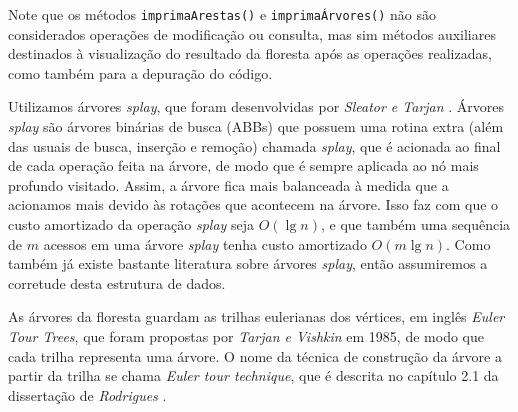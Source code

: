 Note que os métodos \texttt{imprimaArestas()} e \texttt{imprimaÁrvores()} não são considerados operações de modificação ou consulta, mas sim métodos auxiliares destinados à visualização do resultado da floresta após as operações realizadas, como também para a depuração do código.  

Utilizamos árvores \textit{splay}, que foram desenvolvidas por \textit{Sleator e Tarjan} \cite{sleator}. Árvores \textit{splay} são árvores binárias de busca (ABBs) que possuem uma rotina extra (além das usuais de busca, inserção e remoção) chamada \textit{splay}, que é acionada ao final de cada operação feita na árvore, de modo que é sempre aplicada ao nó mais profundo visitado. Assim, a árvore fica mais balanceada à medida que a acionamos mais devido às rotações que acontecem na árvore. Isso faz com que o custo amortizado da operação \textit{splay} seja $O(\lg n)$, e que também uma sequência de $m$ acessos em uma árvore \textit{splay} tenha custo amortizado $O(m \lg n)$.  Como também já existe bastante literatura sobre árvores \textit{splay}, então assumiremos a corretude desta estrutura de dados.  

As árvores da floresta guardam as trilhas eulerianas dos vértices, em inglês \textit{Euler Tour Trees}, que foram propostas por \textit{Tarjan e Vishkin} \cite{tarjan} em 1985, de modo que cada trilha representa uma árvore. O nome da técnica de construção da árvore a partir da trilha se chama \textit{Euler tour technique}, que é descrita no capítulo 2.1 da dissertação de \textit{Rodrigues} \cite{arthur}.   

